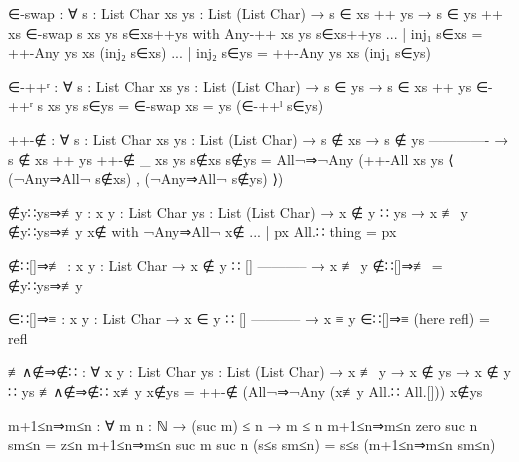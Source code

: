 \begin{code}
  ∈-swap : ∀ {s : List Char} {xs ys : List (List Char)}
    → s ∈ xs ++ ys
    → s ∈ ys ++ xs
  ∈-swap {s} {xs} {ys} s∈xs++ys with Any-++ xs ys s∈xs++ys
  ... | inj₁ s∈xs = ++-Any ys xs (inj₂ s∈xs)
  ... | inj₂ s∈ys = ++-Any ys xs (inj₁ s∈ys)

  ∈-++ʳ : ∀ {s : List Char} {xs ys : List (List Char)}
    → s ∈ ys
    → s ∈ xs ++ ys
  ∈-++ʳ {s} {xs} {ys} s∈ys = ∈-swap {xs = ys} (∈-++ˡ s∈ys)

  ++-∉ : ∀ {s : List Char} {xs ys : List (List Char)}
    → s ∉ xs
    → s ∉ ys
      -------------
    → s ∉ xs ++ ys
  ++-∉ {_} {xs} {ys} s∉xs s∉ys = All¬⇒¬Any
    (++-All xs ys ⟨ (¬Any⇒All¬ s∉xs) , (¬Any⇒All¬ s∉ys) ⟩)

  ∉y∷ys⇒≢y : {x y : List Char} {ys : List (List Char)}
    → x ∉ y ∷ ys
    → x ≢ y
  ∉y∷ys⇒≢y x∉ with ¬Any⇒All¬ x∉
  ... | px All.∷ thing = px

  ∉∷[]⇒≢ : {x y : List Char}
    → x ∉ y ∷ []
      -----------
    → x ≢ y
  ∉∷[]⇒≢ = ∉y∷ys⇒≢y

  ∈∷[]⇒≡ : {x y : List Char}
    → x ∈ y ∷ []
      -----------
    → x ≡ y
  ∈∷[]⇒≡ (here refl) = refl

  ≢∧∉⇒∉∷ : ∀ {x y : List Char} {ys : List (List Char)}
    → x ≢ y
    → x ∉ ys
    → x ∉ y ∷ ys
  ≢∧∉⇒∉∷ x≢y x∉ys = ++-∉ (All¬⇒¬Any (x≢y All.∷ All.[])) x∉ys

  m+1≤n⇒m≤n : ∀ {m n : ℕ} → (suc m) ≤ n → m ≤ n
  m+1≤n⇒m≤n {zero} {suc n} sm≤n = z≤n
  m+1≤n⇒m≤n {suc m} {suc n} (s≤s sm≤n) = s≤s (m+1≤n⇒m≤n sm≤n)
\end{code}
